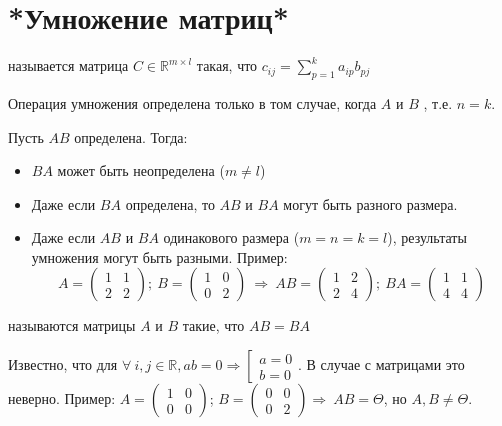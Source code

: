 \section{*Умножение матриц*}
\begin{opred}
 называется матрица $C\in{}\mathbb{R}^{m\times{}l}$ такая, что $c_{ij}=\sum\limits^k_{p=1}a_{ip}b_{pj}$
\end{opred}
\begin{remark}
Операция умножения определена только в том случае, когда $A$ и $B$ , т.е. $n=k$.
\end{remark}
Пусть $AB$ определена. Тогда:\begin{itemize}
\item $BA$ может быть неопределена ($m\neq{}l$)
\item Даже если $BA$ определена, то $AB$ и $BA$ могут быть разного размера.
\item Даже если $AB$ и $BA$ одинакового размера ($m=n=k=l$), результаты умножения могут быть разными. Пример:
$$
A=\begin{pmatrix}
1 & 1 \\
2 & 2
\end{pmatrix};\ B=\begin{pmatrix}
1 & 0 \\
0 & 2
\end{pmatrix}\ \Rightarrow\ AB=\begin{pmatrix}
1 & 2 \\
2 & 4
\end{pmatrix};\ BA=\begin{pmatrix}
1 & 1 \\
4 & 4
\end{pmatrix}
$$
\end{itemize}
\begin{opred}
 называются матрицы $A$ и $B$ такие, что $AB=BA$
\end{opred}
Известно, что для $\forall\ i,j\in\mathbb{R}, ab=0 \Rightarrow \left[ \begin{aligned} 
a=0 \\
b=0
\end{aligned} \right.$. В случае с матрицами это неверно. Пример:
$
A=\begin{pmatrix}
1 & 0 \\
0 & 0
\end{pmatrix}$; $B=\begin{pmatrix}
0 & 0 \\
0 & 2
\end{pmatrix} \Rightarrow\ AB=\Theta$, но $A,B\neq\Theta$.
